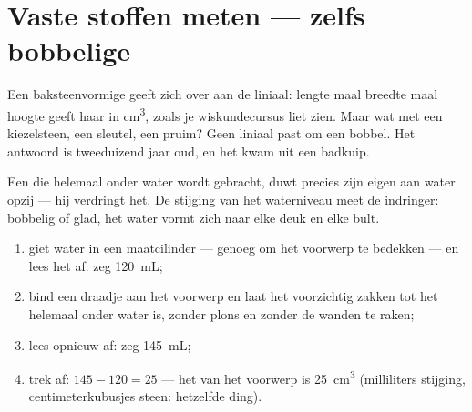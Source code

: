 \section{Vaste stoffen meten --- zelfs bobbelige}

Een baksteenvormige  geeft zich over aan de liniaal: lengte
maal breedte maal hoogte geeft haar  in \unit{cm^3}, zoals je
wiskundecursus liet zien. Maar wat met een kiezelsteen, een sleutel,
een pruim? Geen liniaal past om een bobbel. Het antwoord is
tweeduizend jaar oud, en het kwam uit een badkuip.

\begin{proposition}[Verdringing]\label{prop:g6:mass-and-volume:displacement}
Een  die helemaal onder water wordt gebracht, duwt precies
zijn eigen  aan water opzij --- hij verdringt het. De stijging
van het waterniveau meet de indringer: bobbelig of glad, het water
vormt zich naar elke deuk en elke bult.
\end{proposition}

\begin{method}\label{met:g6:mass-and-volume:rise}
\begin{enumerate}
  \item giet water in een maatcilinder --- genoeg om het voorwerp te
        bedekken --- en lees het  af: zeg \qty{120}{mL};
  \item bind een draadje aan het voorwerp en laat het voorzichtig
        zakken tot het helemaal onder water is, zonder plons en
        zonder de wanden te raken;
  \item lees opnieuw af: zeg \qty{145}{mL};
  \item trek af: $145 - 120 = 25$ --- het  van het voorwerp is
        \qty{25}{cm^3} (milliliters stijging, centimeterkubusjes
        steen: hetzelfde ding).
\end{enumerate}
\end{method}

